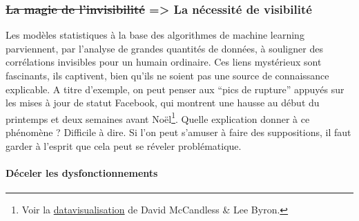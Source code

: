 \documentclass[]{article}
\let\oldparagraph\paragraph
\renewcommand{\paragraph}[1]{\oldparagraph{#1}\mbox{}}
\begin{document}
\newpage

\hypertarget{la-magie-de-linvisibilituxe9-la-nuxe9cessituxe9-de-visibilituxe9}{%
\subsubsection{\texorpdfstring{\sout{La magie de l'invisibilité}
=\textgreater{} La nécessité de
visibilité}{La magie de l'invisibilité =\textgreater{} La nécessité de visibilité}}\label{la-magie-de-linvisibilituxe9-la-nuxe9cessituxe9-de-visibilituxe9}}

Les modèles statistiques à la base des algorithmes de machine learning
parviennent, par l'analyse de grandes quantités de données, à souligner
des corrélations invisibles pour un humain ordinaire. Ces liens
mystérieux sont fascinants, ils captivent, bien qu'ils ne soient pas une
source de connaissance explicable. A titre d'exemple, on peut penser aux
``pics de rupture'' appuyés sur les mises à jour de statut Facebook, qui
montrent une hausse au début du printemps et deux semaines avant
Noël\footnote{Voir la
  \href{https://informationisbeautiful.net/2010/peak-break-up-times-on-facebook/}{datavisualisation}
  de David McCandless \& Lee Byron.}. Quelle explication donner à ce
phénomène ? Difficile à dire. Si l'on peut s'amuser à faire des
suppositions, il faut garder à l'esprit que cela peut se réveler
problématique.

\hypertarget{duxe9celer-les-dysfonctionnements}{%
\paragraph{Déceler les
dysfonctionnements}\label{duxe9celer-les-dysfonctionnements}}
\end{document}
